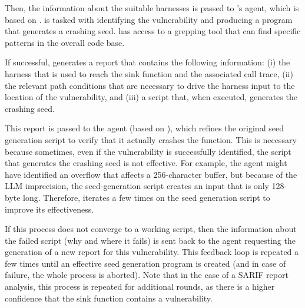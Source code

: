 Then, the information about the suitable harnesses is passed to \discoveryguy's \jimmypwn agent, which is based on \claudefour.
\jimmypwn is tasked with identifying the vulnerability and producing a program that generates a crashing seed. \jimmypwn has access to a grepping tool that can find specific patterns in the overall code base.

If successful, \jimmypwn generates a report that contains the following information: (i) the harness that is used to reach the sink function and the associated call trace, (ii) the relevant path conditions that are necessary to drive the harness input to the location of the vulnerability, and (iii) a script that, when executed, generates the crashing seed.

This report is passed to the \seedgeneration agent (based on \ofourmini), which refines the original seed generation script to verify that it actually crashes the function.
This is necessary because sometimes, even if the vulnerability is successfully identified, the script that generates the crashing seed is not effective.
For example, the \jimmypwn agent might have identified an overflow that affects a 256-character buffer, but because of the LLM imprecision, the seed-generation script creates an input that is only 128-byte long.
Therefore, \seedgeneration iterates a few times on the seed generation script to improve its effectiveness.

If this process does not converge to a working script, then the information about the failed script (why and where it fails) is sent back to the \jimmypwn agent requesting the generation of a new report for this vulnerability.
This feedback loop is repeated a few times until an effective seed generation program is created (and in case of failure, the whole process is aborted).
Note that in the case of a SARIF report analysis, this process is repeated for additional rounds, as there is a higher confidence that the sink function contains a vulnerability. 


